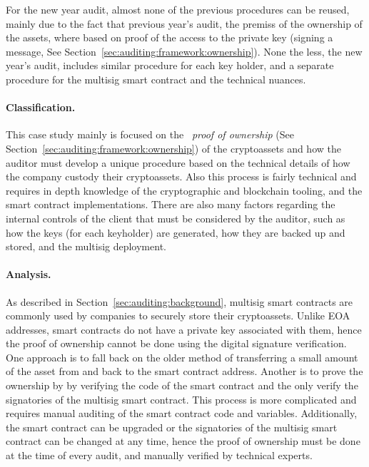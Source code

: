 For the new year audit, almost none of the previous procedures can be reused, mainly due to the fact that previous year's audit, the premiss of the ownership of the assets, where based on proof of the access to the private key (\eg signing a message, See Section~\ref{sec:auditing:framework:ownership}). None the less, the new year's audit, includes similar procedure for each key holder, and a separate procedure for the multisig smart contract and the technical nuances.

\paragraph{Classification.} This case study mainly is focused on the ~\textit{proof of ownership} (See Section~\ref{sec:auditing:framework:ownership}) of the cryptoassets and how the auditor must develop a unique procedure based on the technical details of how the company custody their cryptoassets. Also this process is fairly technical and requires in depth knowledge of the cryptographic and blockchain tooling, and the smart contract implementations. There are also many factors regarding the internal controls of the client that must be considered by the auditor, such as how the keys (for each keyholder) are generated, how they are backed up and stored, and the multisig deployment.


\paragraph{Analysis.} As described in Section~\ref{sec:auditing:background}, multisig smart contracts are commonly used by companies to securely store their cryptoassets. Unlike EOA addresses, smart contracts do not have a private key associated with them, hence the proof of ownership cannot be done using the digital signature verification. One approach is to fall back on the older method of transferring a small amount of the asset from and back to the smart contract address. Another is to prove the ownership by by verifying the code of the smart contract and the only verify the signatories of the multisig smart contract. This process is more complicated and requires manual auditing of the smart contract code and variables. Additionally, the smart contract can be upgraded or the signatories of the multisig smart contract can be changed at any time, hence the proof of ownership must be done at the time of every audit, and manually verified by technical experts. 






